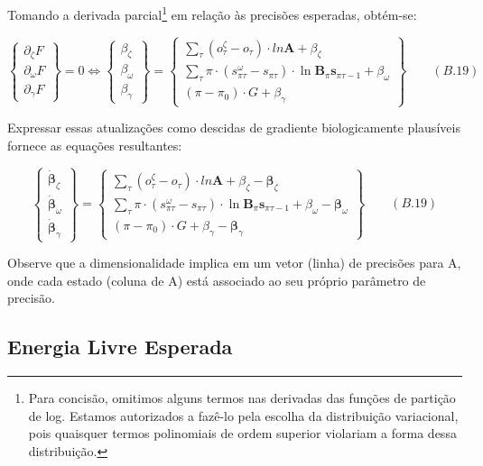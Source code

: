 \documentclass[
  12pt,
]{book}
\begin{document}
Tomando a derivada parcial\footnote{Para concisão, omitimos alguns termos nas derivadas das funções de partição de log. Estamos autorizados a fazê-lo pela escolha da distribuição variacional, pois quaisquer termos polinomiais de ordem superior violariam a forma dessa distribuição.} em relação às precisões esperadas, obtém-se:

\[\begin{Bmatrix} \partial_\zeta F\\ \partial_\omega F \\ \partial_\gamma F \end{Bmatrix} = 0 
\Leftrightarrow \begin{Bmatrix} \beta_\zeta \\ \beta_\omega \\ \beta_\gamma \end{Bmatrix}
=\begin{Bmatrix} \sum_\tau(o^\zeta_\tau - o_\tau) \cdot ln \pmb A + \beta_\zeta \\ \sum_\tau \pi \cdot(s^\omega_{\pi\tau}-s_{\pi\tau}) \cdot \ln \pmb B_\pi \pmb s_{\pi\tau-1} + \beta_\omega \\ (\pi - \pi_0)\cdot G + \beta_\gamma  \end{Bmatrix} \qquad (B.19)\]

Expressar essas atualizações como descidas de gradiente biologicamente plausíveis fornece as equações resultantes:

\[\begin{Bmatrix} \pmb {\dot \beta}_\zeta \\ \pmb {\dot \beta}_\omega \\  \pmb {\dot \beta}_\gamma \end{Bmatrix}
=\begin{Bmatrix} \sum_\tau(o^\zeta_\tau - o_\tau) \cdot ln \pmb A + \beta_\zeta - \pmb \beta_\zeta \\ \sum_\tau \pi \cdot(s^\omega_{\pi\tau}-s_{\pi\tau}) \cdot \ln \pmb B_\pi \pmb s_{\pi\tau-1} + \beta_\omega - \pmb \beta_\omega \\ (\pi - \pi_0)\cdot G + \beta_\gamma - \pmb \beta_\gamma  \end{Bmatrix} \qquad (B.19)\]

Observe que a dimensionalidade implica em um vetor (linha) de precisões para A, onde cada estado (coluna de A) está associado ao seu próprio parâmetro de precisão.

\hypertarget{energia-livre-esperada}{%
\subsection{Energia Livre Esperada}\label{energia-livre-esperada}}
\end{document}
